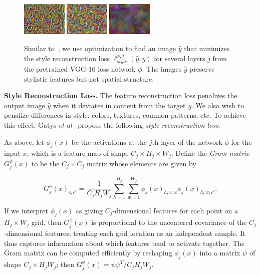 \documentclass[runningheads]{llncs}
\newcommand{\etal}{\textit{et al}}
\begin{document}
\begin{figure}[t]
\begin{center}
    \includegraphics[width=0.19\textwidth]{la_muse_9.jpg}
    \includegraphics[width=0.19\textwidth]{la_muse_16.jpg}
    \includegraphics[width=0.19\textwidth]{la_muse_23.jpg}
  \end{center}
  \vspace{-5mm}
  \caption{Similar to~\cite{gatys2015neural}, we use optimization to find an image $\hat y$
    that minimizes the style reconstruction loss $\ell_{style}^{\phi, j}(\hat y, y)$
    for several layers $j$ from the pretrained VGG-16 loss network $\phi$. The images
    $\hat y$ preserve stylistic features but not spatial structure.
  }
  \label{fig:style-loss}
\end{figure}

\vspace{1mm}
\noindent\textbf{Style Reconstruction Loss.}
The feature reconstruction loss penalizes the output image $\hat y$ when it deviates in
content from the target $y$. We also wish to penalize differences in style:
colors, textures, common patterns, etc. To achieve this effect, Gatys
\etal~\cite{Gatys2015b,gatys2015neural} propose the following \emph{style reconstruction loss}.

As above, let $\phi_j(x)$ be the activations at the $j$th layer of the network $\phi$
for the input $x$, which is a feature map of shape
$C_j\times H_j\times W_j$. Define the \emph{Gram matrix} $G^\phi_j(x)$ to be the
$C_j\times C_j$ matrix whose elements are given by

\begin{equation}
  G^\phi_j(x)_{c, c'} = \frac1{C_jH_jW_j}\sum_{h=1}^{H_j}\sum_{w=1}^{W_j}\phi_j(x)_{h,w,c}\phi_j(x)_{h,w,c'}.
\end{equation}

If we interpret $\phi_j(x)$ as giving $C_j$-dimensional features for each point on a
$H_j\times W_j$ grid, then $G^\phi_j(x)$ is proportional to the uncentered covariance of the
$C_j$-dimensional features, treating each grid location as an independent sample.
It thus captures information about which features tend to activate together.
The Gram matrix can be computed efficiently by reshaping $\phi_j(x)$ into a matrix $\psi$ of
shape $C_j\times H_jW_j$; then $G^\phi_j(x) = \psi\psi^T/C_jH_jW_j$.
\end{document}
